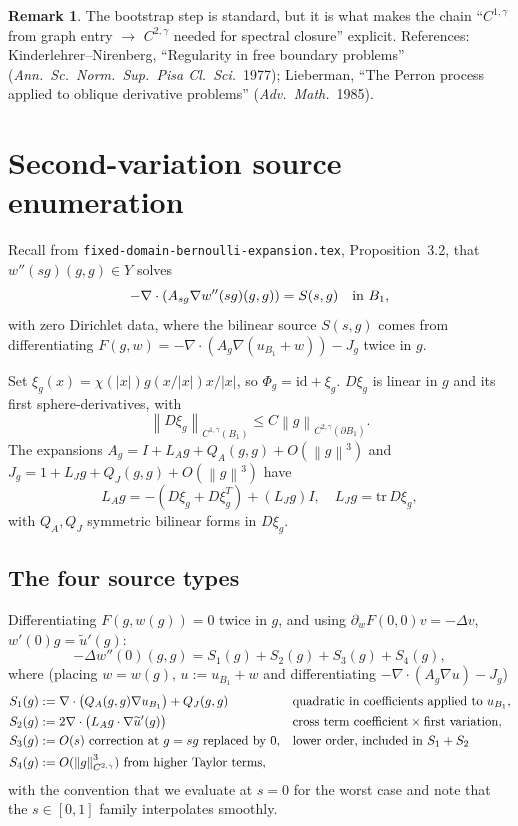 \documentclass[11pt]{article}
\theoremstyle{definition}
\newtheorem{remark}[theorem]{Remark}
\newcommand{\norm}[1]{\left\|#1\right\|}
\newcommand{\abs}[1]{\left|#1\right|}
\begin{document}
\begin{remark}
The bootstrap step is standard, but it is what makes the chain
``\(C^{1,\gamma}\) from graph entry \(\to\) \(C^{2,\gamma}\) needed for
spectral closure'' explicit. References:
Kinderlehrer--Nirenberg, ``Regularity in free boundary problems''
(\emph{Ann.\ Sc.\ Norm.\ Sup.\ Pisa Cl.\ Sci.}\ 1977); Lieberman, ``The
Perron process applied to oblique derivative problems''
(\emph{Adv.\ Math.}\ 1985).
\end{remark}

\section{Second-variation source enumeration}\label{sec:sources}

Recall from \texttt{fixed-domain-bernoulli-expansion.tex},
Proposition~3.2, that $w''(sg)(g,g)\in Y$ solves
\[
-\nabla\cdot(A_{sg}\nabla w''(sg)(g,g))=S(s,g)\quad\hbox{in }B_1,
\]
with zero Dirichlet data, where the bilinear source $S(s,g)$ comes from
differentiating $F(g,w)=-\nabla\cdot(A_g\nabla(u_{B_1}+w))-J_g$ twice in $g$.

Set $\xi_g(x)=\chi(\abs x)g(x/\abs x)x/\abs x$, so $\Phi_g=\mathrm{id}+\xi_g$.
$D\xi_g$ is linear in $g$ and its first sphere-derivatives, with
\[
\norm{D\xi_g}_{C^{1,\gamma}(B_1)}\le C\norm{g}_{C^{2,\gamma}(\partial B_1)}.
\]
The expansions $A_g=I+L_Ag+Q_A(g,g)+O(\norm g^3)$ and
$J_g=1+L_Jg+Q_J(g,g)+O(\norm g^3)$ have
\begin{equation}\label{eq:LQ}
L_Ag=-(D\xi_g+D\xi_g^T)+(L_Jg)I,\quad L_Jg=\mathrm{tr}\,D\xi_g,
\end{equation}
with $Q_A,Q_J$ symmetric bilinear forms in $D\xi_g$.

\subsection{The four source types}

Differentiating $F(g,w(g))=0$ twice in $g$, and using
$\partial_w F(0,0)v=-\Delta v$, $w'(0)g=\widetilde u'(g)$:
\[
-\Delta w''(0)(g,g)
=S_1(g)+S_2(g)+S_3(g)+S_4(g),
\]
where (placing $w=w(g)$, $u:=u_{B_1}+w$ and differentiating $-\nabla\cdot(A_g\nabla u)-J_g$)
\begin{align}
S_1(g)&:=\nabla\cdot\bigl(Q_A(g,g)\nabla u_{B_1}\bigr)+Q_J(g,g)
&&\hbox{quadratic in coefficients applied to }u_{B_1},\label{eq:S1}\\
S_2(g)&:=2\nabla\cdot\bigl(L_Ag\cdot\nabla\widetilde u'(g)\bigr)
&&\hbox{cross term coefficient}\times\hbox{first variation},\label{eq:S2}\\
S_3(g)&:=O(s)\hbox{ correction at }g=sg\hbox{ replaced by 0},
&&\hbox{lower order, included in }S_1+S_2\label{eq:S3}\\
S_4(g)&:=O(\norm{g}_{C^{2,\gamma}}^3)\hbox{ from higher Taylor terms},\label{eq:S4}
\end{align}
with the convention that we evaluate at $s=0$ for the worst case and note that
the $s\in[0,1]$ family interpolates smoothly.
\end{document}
